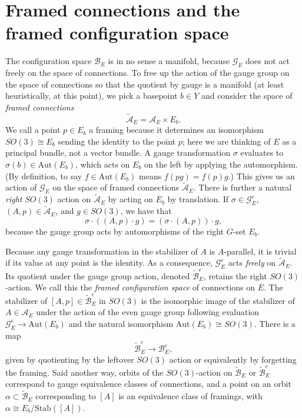 \documentclass{memo-l}
\theoremstyle{definition}
\theoremstyle{remark}
\numberwithin{section}{chapter}
\numberwithin{equation}{chapter}
\begin{document}
\section{Framed connections and the framed configuration space}\label{sec:config-framed}
The configuration space $\mathcal B_E$ is in no sense a manifold, because $\mathcal G_E$ does not act freely on the space of connections. To free up the action of the gauge group on the space of connections so that the quotient by gauge is a manifold (at least heuristically, at this point), we pick a basepoint $b \in Y$ and consider the space of \emph{framed connections} 
$$\widetilde{\mathcal A}_E = \mathcal A_E \times E_b.$$ 
We call a point $p \in E_b$ a framing because it determines an isomorphism $SO(3) \cong E_b$ sending the identity to the point $p$; here we are thinking of $E$ as a principal bundle, not a vector bundle. A gauge transformation $\sigma$ evaluates to $\sigma(b) \in \text{Aut}(E_b)$, which acts on $E_b$ on the left by applying the automorphism. (By definition, to say $f\in\text{Aut}(E_b)$ means $f(pg) = f(p)g$.) This gives us an action of $\mathcal G_E$ on the space of framed connections $\widetilde{\mathcal A}_E$. There is further a natural \emph{right} $SO(3)$ action on $\widetilde{\mathcal A}_E$ by acting on $E_b$ by translation. If $\sigma \in \mathcal G^e_E$, $(A,p) \in \widetilde{\mathcal A}_E$, and $g \in SO(3)$, we have that 
$$\sigma \cdot ((A,p) \cdot g) = (\sigma \cdot (A,p)) \cdot g,$$ 
because the gauge group acts by automorphisms of the right $G$-set $E_b$.

Because any gauge transformation in the stabilizer of $A$ is $A$-parallel, it is trivial if its value at any point is the identity. As a consequence, $\mathcal G^e_E$ acts \textit{freely} on $\widetilde{\mathcal A}_E$. Its quotient under the gauge group action, denoted $\widetilde{\mathcal B}^e_E$, retains the right $SO(3)$-action. We call this the \textit{framed configuration space} of connections on $E$. The stabilizer of $[A,p] \in \widetilde{\mathcal B}^e_E$ in $SO(3)$ is the isomorphic image of the stabilizer of $A \in \mathcal A_E$ under the action of the even gauge group following evaluation $\mathcal G^e_E \to \text{Aut}(E_b)$ and the natural isomorphism $\text{Aut}(E_b) \cong SO(3)$. There is a map $$\widetilde{\mathcal B}^e_E \to \mathcal B^e_E,$$ given by quotienting by the leftover $SO(3)$ action or equivalently by forgetting the framing. Said another way, orbits of the $SO(3)$-action on $\widetilde{\mathcal B}_E$ or $\widetilde{\mathcal B}^e_E$ correspond to gauge equivalence classes of connections, and a point on an orbit $\alpha \subset \widetilde{\mathcal B}_E$ corresponding to $[A]$ is an equivalence class of framings, with $\alpha \cong E_b/\text{Stab}([A])$.
\end{document}
